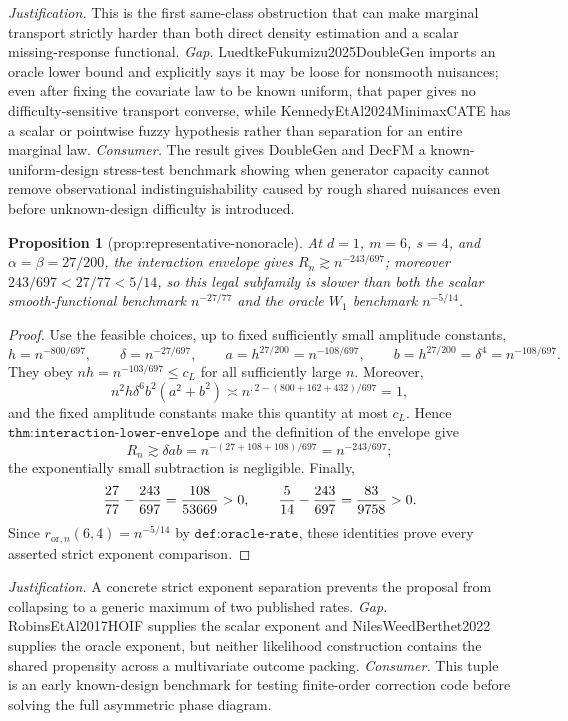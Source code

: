 \documentclass{article}
\newtheorem{proposition}{Proposition}
\begin{document}
\par\smallskip\noindent \textit{Justification.} This is the first same-class obstruction that can make marginal transport strictly harder than both direct density estimation and a scalar missing-response functional. \textit{Gap.} LuedtkeFukumizu2025DoubleGen imports an oracle lower bound and explicitly says it may be loose for nonsmooth nuisances; even after fixing the covariate law to be known uniform, that paper gives no difficulty-sensitive transport converse, while KennedyEtAl2024MinimaxCATE has a scalar or pointwise fuzzy hypothesis rather than separation for an entire marginal law. \textit{Consumer.} The result gives DoubleGen and DecFM a known-uniform-design stress-test benchmark showing when generator capacity cannot remove observational indistinguishability caused by rough shared nuisances even before unknown-design difficulty is introduced.

\begin{proposition}[prop:representative-nonoracle]\label{prop:representative-nonoracle}
At \(d=1\), \(m=6\), \(s=4\), and \(\alpha=\beta=27/200\), the interaction envelope gives \(R_n\gtrsim n^{-243/697}\); moreover \(243/697<27/77<5/14\), so this legal subfamily is slower than both the scalar smooth-functional benchmark \(n^{-27/77}\) and the oracle \(W_1\) benchmark \(n^{-5/14}\).
\end{proposition}
\begin{proof}
Use the feasible choices, up to fixed sufficiently small amplitude constants,
\[
 h=n^{-800/697},\qquad \delta=n^{-27/697},\qquad
 a=h^{27/200}=n^{-108/697},\qquad
 b=h^{27/200}=\delta^4=n^{-108/697}.
\]
They obey \(nh=n^{-103/697}\leq c_L\) for all sufficiently large \(n\).  Moreover,
\[
 n^2h\delta^6b^2(a^2+b^2)
 \asymp n^{,2-(800+162+432)/697}=1,
\]
and the fixed amplitude constants make this quantity at most \(c_L\).  Hence \(\texttt{thm:interaction-lower-envelope}\) and the definition of the envelope give
\[
 R_n\gtrsim \delta ab=n^{-(27+108+108)/697}=n^{-243/697};
\]
the exponentially small subtraction is negligible.  Finally,
\[
 {27\over77}-{243\over697}={108\over53669}>0,
 \qquad
 {5\over14}-{243\over697}={83\over9758}>0.
\]
Since \(r_{\mathrm{or},n}(6,4)=n^{-5/14}\) by \(\texttt{def:oracle-rate}\), these identities prove every asserted strict exponent comparison.
\end{proof}
\par\smallskip\noindent \textit{Justification.} A concrete strict exponent separation prevents the proposal from collapsing to a generic maximum of two published rates. \textit{Gap.} RobinsEtAl2017HOIF supplies the scalar exponent and NilesWeedBerthet2022 supplies the oracle exponent, but neither likelihood construction contains the shared propensity across a multivariate outcome packing. \textit{Consumer.} This tuple is an early known-design benchmark for testing finite-order correction code before solving the full asymmetric phase diagram.
\end{document}
